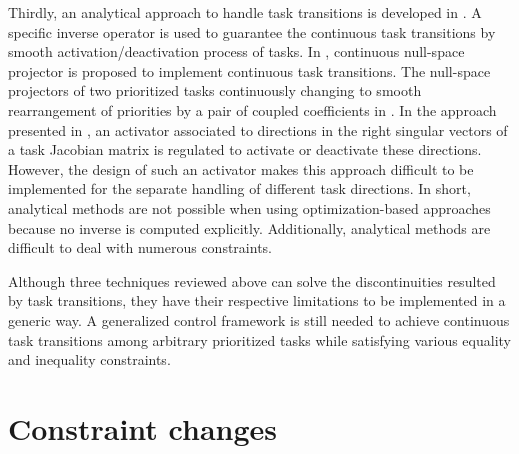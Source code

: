 Thirdly, an analytical approach to handle task transitions is developed in \cite{mansard2009}. A specific inverse operator is used to guarantee the continuous task transitions by smooth activation/deactivation process of tasks. In \cite{petric2013,dietrich2012}, continuous null-space projector is proposed to implement continuous task transitions. The null-space projectors of two prioritized tasks continuously changing to smooth rearrangement of priorities by a pair of coupled coefficients in \cite{petric2013}. In the approach presented in \cite{dietrich2012}, an activator associated to directions in the right singular vectors of a task Jacobian matrix is regulated to activate or deactivate these directions. However, the design of such an activator makes this approach difficult to be implemented for the separate handling of different task directions. In short, analytical methods are not possible when using optimization-based approaches because no inverse is computed explicitly. Additionally, analytical methods are difficult to deal with numerous constraints.

Although three techniques reviewed above can solve the discontinuities resulted by task transitions, they have their respective limitations to be implemented in a generic way. A generalized control framework is still needed to achieve continuous task transitions among arbitrary prioritized tasks while satisfying various equality and inequality constraints.

\section{Constraint changes}



